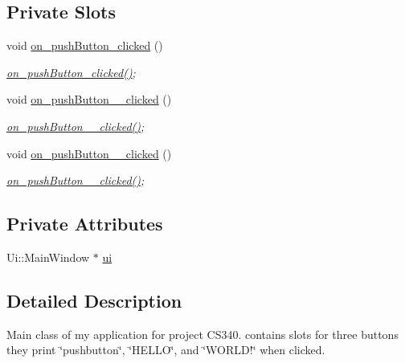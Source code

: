 \subsection*{Private Slots}
\begin{DoxyCompactItemize}
\item 
void \hyperlink{class_main_window_a4de79c63c7fa0b8d7c468ac71f20be81}{on\-\_\-push\-Button\-\_\-clicked} ()
\begin{DoxyCompactList}\small\item\em \hyperlink{class_main_window_a4de79c63c7fa0b8d7c468ac71f20be81}{on\-\_\-push\-Button\-\_\-clicked()}; \end{DoxyCompactList}\item 
void \hyperlink{class_main_window_ae0e46dc3da4ee07bf66e73e20300220c}{on\-\_\-push\-Button\-\_\-\_\-clicked} ()
\begin{DoxyCompactList}\small\item\em \hyperlink{class_main_window_ae0e46dc3da4ee07bf66e73e20300220c}{on\-\_\-push\-Button\-\_\-\_\-clicked()}; \end{DoxyCompactList}\item 
void \hyperlink{class_main_window_a12cf88402a93adef89645ba4e4cb7be1}{on\-\_\-push\-Button\-\_\-\_\-clicked} ()
\begin{DoxyCompactList}\small\item\em \hyperlink{class_main_window_a12cf88402a93adef89645ba4e4cb7be1}{on\-\_\-push\-Button\-\_\-\_\-clicked()}; \end{DoxyCompactList}\end{DoxyCompactItemize}
\subsection*{Private Attributes}
\begin{DoxyCompactItemize}
\item 
Ui\-::\-Main\-Window $\ast$ \hyperlink{class_main_window_a35466a70ed47252a0191168126a352a5}{ui}
\end{DoxyCompactItemize}


\subsection{Detailed Description}
Main class of my application for project C\-S340. contains slots for three buttons they print \char`\"{}pushbutton\char`\"{}, \char`\"{}\-H\-E\-L\-L\-O\char`\"{}, and \char`\"{}\-W\-O\-R\-L\-D!\char`\"{} when clicked. 

